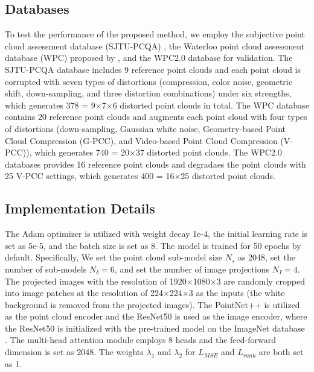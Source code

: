 \documentclass{article}
\begin{document}
\subsection{Databases}
To test the performance of the proposed method, we employ the subjective point cloud assessment database (SJTU-PCQA) \cite{yang2020predicting}, the Waterloo point cloud assessment database (WPC) proposed by \cite{liu2022perceptual}, and the WPC2.0 database \cite{liu2021reduced} for validation. The SJTU-PCQA database includes 9 reference point clouds and each point cloud is corrupted with seven types of distortions (compression, color noise, geometric shift, down-sampling, and three distortion combinations) under six strengths, which generates 378 = 9$\times$7$\times$6 distorted point clouds in total.
The WPC database contains 20 reference point clouds and augments each point cloud with four types of distortions (down-sampling, Gaussian white noise, Geometry-based Point Cloud Compression (G-PCC), and Video-based Point Cloud Compression (V-PCC)), which generates 740 = 20$\times$37 distorted point clouds. The WPC2.0 databases provides 16 reference point clouds and degradaes the point clouds with 25 V-PCC settings, which generates 400 = 16$\times$25 distorted point clouds.

\subsection{Implementation Details}
The Adam optimizer \cite{kingma2014adam} is utilized with weight decay 1e-4, the initial learning rate is set as 5e-5, and the batch size is set as 8. The model is trained for 50 epochs by default. Specifically, We set the point cloud sub-model size $N_{s}$ as 2048, set the number of sub-models $N_{\delta} = 6$, and set the number of image projections $N_{I}=4$. The projected images with the resolution of 1920$\times$1080$\times$3 are randomly cropped into image patches at the resolution of 224$\times$224$\times$3 as the inputs (the white background is removed from the projected images). The PointNet++ \cite{qi2017pointnet++} is utilized as the point cloud encoder and the ResNet50 \cite{he2016deep} is used as the image encoder, where the ResNet50 is initialized with the pre-trained model on the ImageNet database \cite{deng2009imagenet}. The multi-head attention module employs 8 heads and the feed-forward dimension is set as 2048. The weights $\lambda_{1}$ and $\lambda_{2}$ for $L_{MSE}$ and $ L_{r a n k}$ are both set as 1. 
\end{document}

